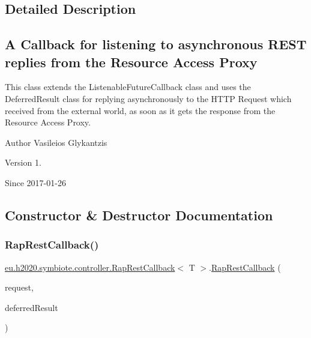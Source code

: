 \subsection{Detailed Description}
\subsection*{A Callback for listening to asynchronous R\+E\+ST replies from the Resource Access Proxy}

This class extends the Listenable\+Future\+Callback class and uses the Deferred\+Result class for replying asynchronously to the H\+T\+TP Request which received from the external world, as soon as it gets the response from the Resource Access Proxy.

\begin{DoxyAuthor}{Author}
Vasileios Glykantzis 
\end{DoxyAuthor}
\begin{DoxyVersion}{Version}
1. 
\end{DoxyVersion}
\begin{DoxySince}{Since}
2017-\/01-\/26 
\end{DoxySince}


\subsection{Constructor \& Destructor Documentation}
\mbox{\label{classeu_1_1h2020_1_1symbiote_1_1controller_1_1RapRestCallback_a86d21f4cafc340a56c2c398fde646ffc}} 
\subsubsection{\texorpdfstring{Rap\+Rest\+Callback()}{RapRestCallback()}}
{\footnotesize\ttfamily \hyperlink{classeu_1_1h2020_1_1symbiote_1_1controller_1_1RapRestCallback}{eu.\+h2020.\+symbiote.\+controller.\+Rap\+Rest\+Callback}$<$ T $>$.\hyperlink{classeu_1_1h2020_1_1symbiote_1_1controller_1_1RapRestCallback}{Rap\+Rest\+Callback} (\begin{DoxyParamCaption}\item[{String}]{request,  }\item[{Deferred\+Result}]{deferred\+Result }\end{DoxyParamCaption})}

